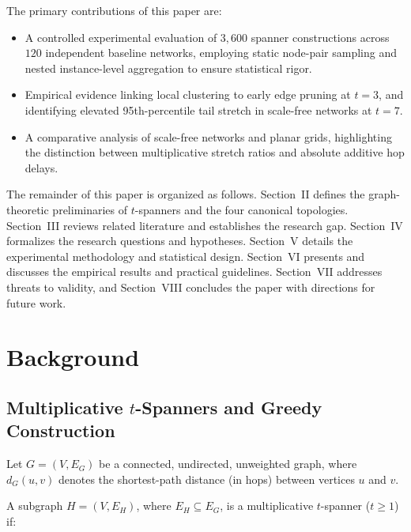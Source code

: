 \documentclass[conference]{IEEEtran}
\begin{document}
The primary contributions of this paper are:

\begin{itemize}
    \item A controlled experimental evaluation of $3,600$ spanner constructions across $120$ independent baseline networks, employing static node-pair sampling and nested instance-level aggregation to ensure statistical rigor.

    \item Empirical evidence linking local clustering to early edge pruning at $t=3$, and identifying elevated 95th-percentile tail stretch in scale-free networks at $t=7$.

    \item A comparative analysis of scale-free networks and planar grids, highlighting the distinction between multiplicative stretch ratios and absolute additive hop delays.
\end{itemize}

The remainder of this paper is organized as follows. Section~II defines the graph-theoretic preliminaries of $t$-spanners and the four canonical topologies. Section~III reviews related literature and establishes the research gap. Section~IV formalizes the research questions and hypotheses. Section~V details the experimental methodology and statistical design. Section~VI presents and discusses the empirical results and practical guidelines. Section~VII addresses threats to validity, and Section~VIII concludes the paper with directions for future work.


\section{Background}

\subsection{Multiplicative $t$-Spanners and Greedy Construction}

Let $G = (V, E_G)$ be a connected, undirected, unweighted graph, where $d_G(u,v)$ denotes the shortest-path distance (in hops) between vertices $u$ and $v$.

A subgraph $H = (V, E_H)$, where $E_H \subseteq E_G$, is a multiplicative $t$-spanner ($t \geq 1$) if:
\end{document}
